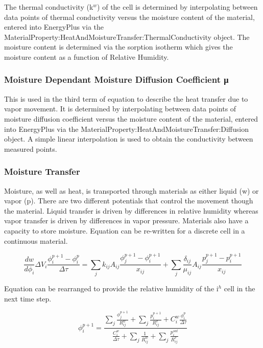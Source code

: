 The thermal conductivity (k\(^{w}\)) of the cell is determined by interpolating between data points of thermal conductivity versus the moisture content of the material, entered into EnergyPlus via the MaterialProperty:HeatAndMoistureTransfer:ThermalConductivity object. The moisture content is determined via the sorption isotherm which gives the moisture content as a function of Relative Humidity.

\subsubsection{Moisture Dependant Moisture Diffusion Coefficient μ}\label{moisture-dependant-moisture-diffusion-coefficient-ux3bc}

This is used in the third term of equation to describe the heat transfer due to vapor movement. It is determined by interpolating between data points of moisture diffusion coefficient versus the moisture content of the material, entered into EnergyPlus via the MaterialProperty:HeatAndMoistureTransfer:Diffusion object. A simple linear interpolation is used to obtain the conductivity between measured points.

\subsubsection{Moisture Transfer}\label{moisture-transfer}

Moisture, as well as heat, is transported through materials as either liquid (w) or vapor (p). There are two different potentials that control the movement though the material. Liquid transfer is driven by differences in relative humidity whereas vapor transfer is driven by differences in vapor pressure. Materials also have a capacity to store moisture. Equation can be re-written for a discrete cell in a continuous material.

\begin{equation}
\frac{{dw}}{{d{\phi_i}}}\Delta {V_i}\frac{{\phi_i^{p + 1} - \phi_i^p}}{{\Delta \tau }} = \sum\limits_j {{k_{ij}}{A_{ij}}\frac{{\phi_j^{p + 1} - \phi_i^{p + 1}}}{{{x_{ij}}}}}  + \sum\limits_j {\frac{{{\delta_{ij}}}}{{{\mu_{ij}}}}{A_{ij}}\frac{{p_j^{p + 1} - p_i^{p + 1}}}{{{x_{ij}}}}}
\end{equation}

Equation can be rearranged to provide the relative humidity of the i\(^{h}\) cell in the next time step.

\begin{equation}
\phi_i^{p + 1} = \frac{{\sum\nolimits_j {\frac{{\phi_j^{p + 1}}}{{R_{ij}^w}}}  + \sum\nolimits_j {\frac{{p_i^{p + 1}}}{{R_{ij}^v}}}  + C_i^w\frac{{\phi_i^p}}{{\Delta \tau }}}}{{\frac{{C_i^w}}{{\Delta \tau }} + \sum\nolimits_j {\frac{1}{{R_{ij}^w}} + \sum\nolimits_j {\frac{{p_i^{sat}}}{{R_{ij}^v}}} } }}
\end{equation}

